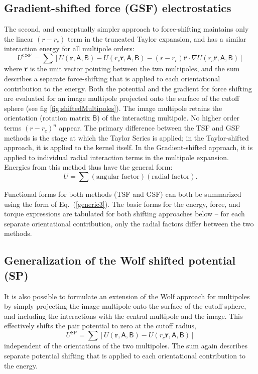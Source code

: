 \subsection{Gradient-shifted force (GSF) electrostatics}
The second, and conceptually simpler approach to force-shifting
maintains only the linear $(r-r_c)$ term in the truncated Taylor
expansion, and has a similar interaction energy for all multipole
orders:
\begin{equation}
U^{\text{GSF}} = \sum \left[ U(\mathbf{r}, \mathsf{A}, \mathsf{B}) -
U(r_c \hat{\mathbf{r}},\mathsf{A}, \mathsf{B}) - (r-r_c)
\hat{\mathbf{r}} \cdot \nabla U(r_c \hat{\mathbf{r}},\mathsf{A}, \mathsf{B}) \right]
\label{generic2}
\end{equation}
where $\hat{\mathbf{r}}$ is the unit vector pointing between the two
multipoles, and the sum describes a separate force-shifting that is
applied to each orientational contribution to the energy.  Both the
potential and the gradient for force shifting are evaluated for an
image multipole projected onto the surface of the cutoff sphere (see
fig \ref{fig:shiftedMultipoles}).  The image multipole retains the
orientation (rotation matrix $\mathsf{B}$) of the interacting multipole.  No
higher order terms $(r-r_c)^n$ appear.  The primary difference between
the TSF and GSF methods is the stage at which the Taylor Series is
applied; in the Taylor-shifted approach, it is applied to the kernel
itself.  In the Gradient-shifted approach, it is applied to individual
radial interaction terms in the multipole expansion.  Energies from
this method thus have the general form:
\begin{equation}
U= \sum  (\text{angular factor}) (\text{radial factor}).
\label{generic3}
\end{equation}

Functional forms for both methods (TSF and GSF) can both be summarized
using the form of Eq.~(\ref{generic3}).  The basic forms for the
energy, force, and torque expressions are tabulated for both shifting
approaches below -- for each separate orientational contribution, only
the radial factors differ between the two methods.

\subsection{Generalization of the Wolf shifted potential (SP)}
It is also possible to formulate an extension of the Wolf approach for
multipoles by simply projecting the image multipole onto the surface
of the cutoff sphere, and including the interactions with the central
multipole and the image.  This effectively shifts the pair potential
to zero at the cutoff radius,
\begin{equation}
U^{\text{SP}} = \sum \left[ U(\mathbf{r}, \mathsf{A}, \mathsf{B}) -
U(r_c \hat{\mathbf{r}},\mathsf{A}, \mathsf{B}) \right]
\label{eq:SP}
\end{equation}
independent of the orientations of the two multipoles.  The sum again
describes separate potential shifting that is applied to each
orientational contribution to the energy.
 

